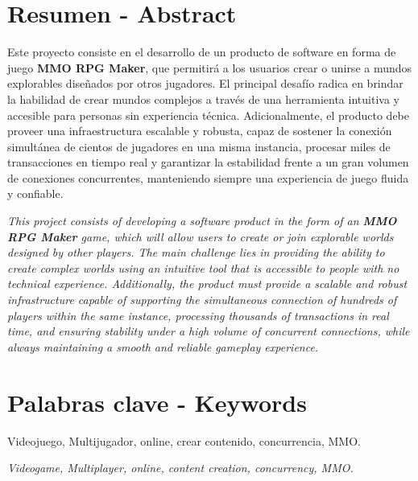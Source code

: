 \section{Resumen - Abstract}

Este proyecto consiste en el desarrollo de un producto de software en forma de juego \textbf{MMO RPG Maker},
que permitirá a los usuarios crear o unirse a mundos explorables diseñados por otros jugadores.
El principal desafío radica en brindar la habilidad de crear mundos complejos a través de una herramienta intuitiva y accesible para personas sin 
experiencia técnica. Adicionalmente, el producto debe proveer una infraestructura escalable y robusta, capaz de sostener la conexión simultánea de cientos de jugadores en una misma instancia,
procesar miles de transacciones en tiempo real y garantizar la estabilidad frente a un gran volumen de conexiones concurrentes,
manteniendo siempre una experiencia de juego fluida y confiable.
\vspace{0.25cm}

\textit{This project consists of developing a software product in the form of an \textbf{MMO RPG Maker} game,
which will allow users to create or join explorable worlds designed by other players.
The main challenge lies in providing the ability to create complex worlds using an intuitive tool that is accessible to people with no technical experience.
Additionally, the product must provide a scalable and robust infrastructure capable of supporting the simultaneous connection of hundreds of players within the same instance,
processing thousands of transactions in real time, and ensuring stability under a high volume of concurrent connections,
while always maintaining a smooth and reliable gameplay experience.}

\section{Palabras clave - Keywords}

Videojuego, Multijugador, online, crear contenido, concurrencia, MMO.
\vspace{0.25cm}

\textit{Videogame, Multiplayer, online, content creation, concurrency, MMO.}
